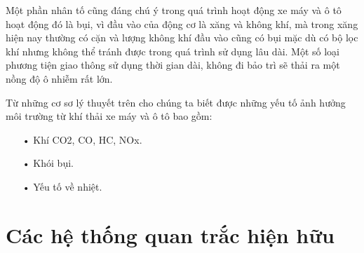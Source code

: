 Một phần nhân tố cũng đáng chú ý trong quá trình hoạt động xe máy và ô tô hoạt động đó là bụi, vì đầu vào của động cơ là xăng và không khí, mà trong xăng hiện nay thường có cặn và lượng không khí đầu vào cũng có bụi mặc dù có bộ lọc khí nhưng không thể tránh được trong quá trình sử dụng lâu dài. Một số loại phương tiện giao thông sử dụng thời gian dài, không đi bảo trì sẽ thải ra một nồng độ ô nhiễm rất lớn.

Từ những cơ sơ lý thuyết trên cho chúng ta biết được những yếu tố ảnh hưởng môi trường từ khí thải xe máy và ô tô bao gồm:
\begin{itemize}
\item[•]Khí CO2, CO, HC, NOx.
\item[•]Khói bụi.
\item[•]Yếu tố về nhiệt.
\end{itemize}








\section{Các hệ thống quan trắc hiện hữu}
